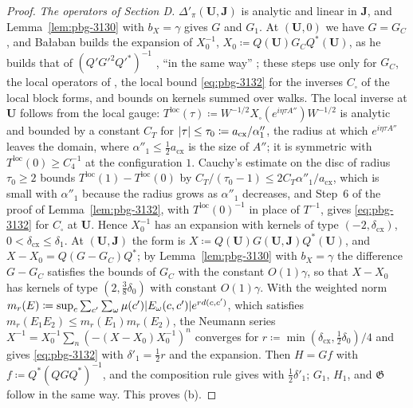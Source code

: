 \documentclass[11pt]{preprint}
\DeclarePairedDelimiter{\abs}{\lvert}{\rvert}
\numberwithin{equation}{section}
\theoremstyle{definition}
\theoremstyle{remark}
\theoremstyle{plain}
\begin{document}
\begin{proof}
\emph{The operators of Section D.} $\Delta'_\pi(\mathbf U, \mathbf J)$ is analytic and linear in $\mathbf J$, and Lemma~\ref{lem:pbg-3130} with $b_X = \gamma$ gives $G$ and $G_1$. At $(\mathbf U, 0)$ we have $G = G_C$, and Ba{\l}aban builds the expansion of $X_0^{-1}$, $X_0 \coloneqq Q(\mathbf U)G_CQ^*(\mathbf U)$, as he builds that of $(Q'G'^2Q'^*)^{-1}$ \cite[(3.95)--(3.97), p.~411, l.~5--p.~412, l.~30]{BalabanPBG}, ``in the same way'' \cite[p.~422, ll.~15--16]{BalabanPBG}; these steps use only \cite[Theorem~3.10]{BalabanPBG} for $G_C$, the local operators of \cite[Corollary~3.6]{BalabanPBG}, the local bound \eqref{eq:pbg-3132} for the inverses $C_\square$ of the local block forms, and bounds on kernels summed over walks. The local inverse at $\mathbf U$ follows from the local gauge: $T^{\mathrm{loc}}(\tau) \coloneqq W^{-1/2}X_\square(e^{i\eta\tau A''})W^{-1/2}$ is analytic and bounded by a constant $C_T$ for $\abs\tau \leq \tau_0 \coloneqq a_{\mathrm{cx}}/\alpha''_1$, the radius at which $e^{i\eta\tau A''}$ leaves the domain, where $\alpha''_1 \leq \frac12a_{\mathrm{cx}}$ is the size of $A''$; it is symmetric with $T^{\mathrm{loc}}(0) \geq C_4^{-1}$ at the configuration $1$. Cauchy's estimate on the disc of radius $\tau_0 \geq 2$ bounds $T^{\mathrm{loc}}(1) - T^{\mathrm{loc}}(0)$ by $C_T/(\tau_0 - 1) \leq 2C_T\alpha''_1/a_{\mathrm{cx}}$, which is small with $\alpha''_1$ because the radius grows as $\alpha''_1$ decreases, and Step~6 of the proof of Lemma~\ref{lem:pbg-3132}, with $T^{\mathrm{loc}}(0)^{-1}$ in place of $T^{-1}$, gives \eqref{eq:pbg-3132} for $C_\square$ at $\mathbf U$. Hence $X_0^{-1}$ has an expansion with kernels of type $(-2, \delta_{\mathrm{cx}})$, $0 < \delta_{\mathrm{cx}} \leq \delta_1$. At $(\mathbf U, \mathbf J)$ the form is $X \coloneqq Q(\mathbf U)G(\mathbf U, \mathbf J)Q^*(\mathbf U)$, and $X - X_0 = Q(G - G_C)Q^*$; by Lemma~\ref{lem:pbg-3130} with $b_X = \gamma$ the difference $G - G_C$ satisfies the bounds of $G_C$ with the constant $O(1)\gamma$, so that $X - X_0$ has kernels of type $(2, \frac38\delta_0)$ with constant $O(1)\gamma$. With the weighted norm $m_r(E) \coloneqq \sup_c\sum_{c'}\sum_\omega\mu(c')\abs{E_\omega(c, c')}e^{rd(c,c')}$, which satisfies $m_r(E_1E_2) \leq m_r(E_1)m_r(E_2)$, the Neumann series $X^{-1} = X_0^{-1}\sum_n(-(X - X_0)X_0^{-1})^n$ converges for $r \coloneqq \min(\delta_{\mathrm{cx}}, \frac12\delta_0)/4$ and gives \eqref{eq:pbg-3132} with $\delta'_1 = \frac12r$ and the expansion. Then $H = Gf$ with $f \coloneqq Q^*(QGQ^*)^{-1}$, and the composition rule gives \cite[(3.133)]{BalabanPBG} with $\frac12\delta'_1$; $G_1$, $H_1$, and $\mathfrak G$ follow in the same way. This proves (b).


\end{proof}
\end{document}
